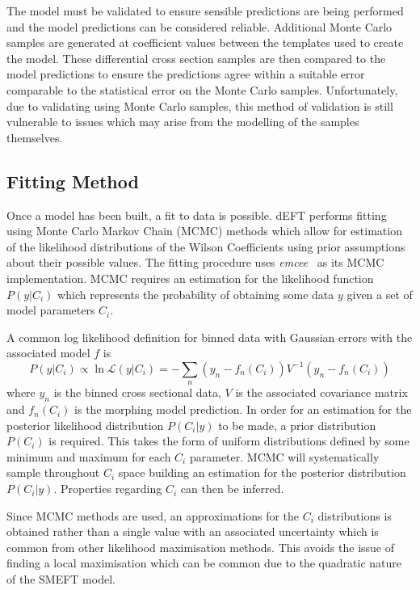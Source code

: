 \documentclass[a4paper,11pt]{article}
\begin{document}
The model must be validated to ensure sensible predictions are being performed and the model predictions can be considered reliable.
Additional Monte Carlo samples are generated at coefficient values between the templates used to create the model.
These differential cross section samples are then compared to the model predictions to ensure the predictions agree within a suitable error comparable to the statistical error on the Monte Carlo samples.
Unfortunately, due to validating using Monte Carlo samples, this method of validation is still vulnerable to issues which may arise from the modelling of the samples themselves.

\subsection{Fitting Method}\label{sec:fitting}
Once a model has been built, a fit to data is possible.
dEFT performs fitting using Monte Carlo Markov Chain (MCMC) methods which allow for estimation of the likelihood distributions of the Wilson Coefficients using prior assumptions about their possible values.
The fitting procedure uses \emph{emcee}~\cite{Foreman_Mackey_2013} as its MCMC implementation.
MCMC requires an estimation for the likelihood function $P(y | C_{i})$ which represents the probability of obtaining some data $y$ given a set of model parameters $C_{i}$.

A common log likelihood definition for binned data with Gaussian errors with the associated model $f$ is
\begin{equation}\label{eq:likelihood}
    P(y | C_{i}) \propto \ln\mathcal{L}(y | C_{i}) = -\sum\limits_{n} (y_{n} - f_{n}(C_{i})) V^{-1} (y_{n} - f_{n}(C_{i}))
\end{equation}
where $y_{n}$ is the binned cross sectional data, $V$ is the associated covariance matrix and $f_{n}(C_{i})$ is the morphing model prediction.
In order for an estimation for the posterior likelihood distribution $P(C_{i} | y)$ to be made, a prior distribution $P(C_{i})$ is required.
This takes the form of uniform distributions defined by some minimum and maximum for each $C_{i}$ parameter.
MCMC will systematically sample throughout $C_{i}$ space building an estimation for the posterior distribution $P(C_{i}|y)$.
Properties regarding $C_{i}$ can then be inferred.

Since MCMC methods are used, an approximations for the $C_{i}$ distributions is obtained rather than a single value with an associated uncertainty which is common from other likelihood maximisation methods.
This avoids the issue of finding a local maximisation which can be common due to the quadratic nature of the SMEFT model.
\end{document}
